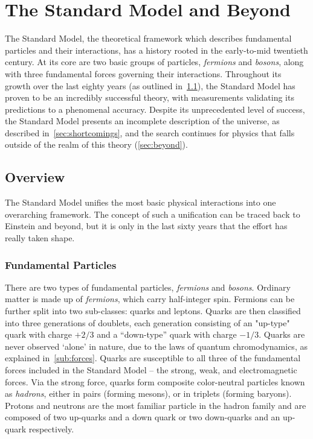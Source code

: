 \chapter{The Standard Model and Beyond}
\label{chapter:sm}
The Standard Model, the theoretical framework which describes fundamental
particles and their interactions, has a history rooted in the early-to-mid
twentieth century. At its core are two basic groups of particles,
\emph{fermions} and \emph{bosons}, along with three fundamental forces governing
their interactions. Throughout its growth over the last eighty years (as
outlined in~\ref{sec:overview}), the Standard Model has proven to be an
incredibly successful theory, with measurements validating its predictions to a
phenomenal accuracy. Despite its unprecedented level of success, the
Standard Model presents an incomplete description of the universe, as described
in~\ref{sec:shortcomings}, and the search continues for physics that falls
outside of the realm of this theory (\ref{sec:beyond}).

\section{Overview} \label{sec:overview}
The Standard Model unifies the most basic physical interactions into one
overarching framework.  The concept of such a unification can be traced back to
Einstein and beyond, but it is only in the last sixty years that the effort has
really taken shape. 

\subsection{Fundamental Particles} 
\label{sub:funpart}
There are two types of fundamental particles, \emph{fermions} and \emph{bosons}.
Ordinary matter is made up of \emph{fermions}, which carry half-integer spin.
Fermions can be further split into two sub-classes: quarks and leptons.  Quarks
are then classified into three generations of doublets, each generation
consisting of an "up-type" quark with charge $+2/3$ and a ``down-type'' quark
with charge $-1/3$. Quarks are never observed `alone' in nature, due to the laws
of quantum chromodynamics, as explained in~\ref{sub:forces}. Quarks are
susceptible to all three of the fundamental forces included in the Standard
Model -- the strong, weak, and electromagnetic forces. Via the strong force,
quarks form composite color-neutral particles known as \emph{hadrons}, either in
pairs (forming mesons), or in triplets (forming baryons). Protons and neutrons
are the most familiar particle in the hadron family and are composed of two
up-quarks and a down quark or two down-quarks and an up-quark respectively.


